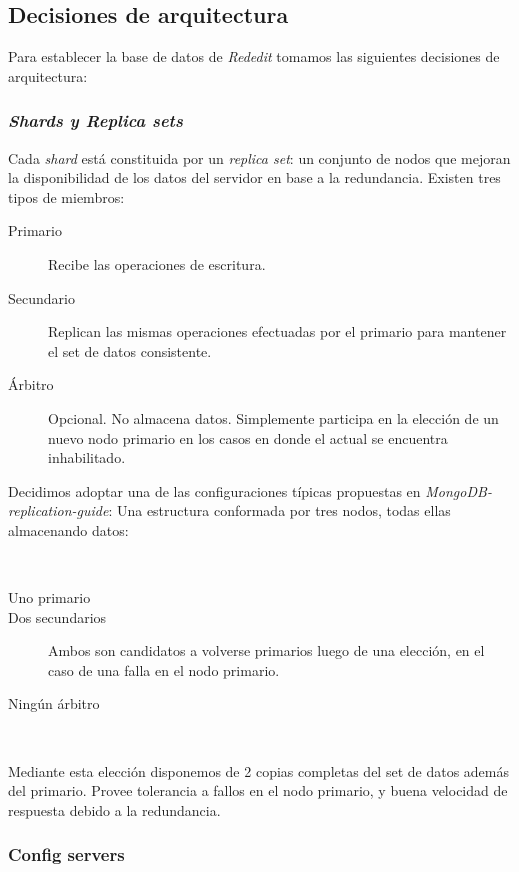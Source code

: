 \subsection{Decisiones de arquitectura}

Para establecer la base de datos de \emph{Rededit} tomamos las siguientes decisiones de arquitectura:

\subsubsection{\emph{Shards y Replica sets}}

Cada \emph{shard} está constituida por un \emph{replica set}: un conjunto de nodos que mejoran la 
disponibilidad de los datos del
servidor en base a la redundancia. Existen tres tipos de miembros:

\begin{description}
	\item[Primario] Recibe las operaciones de escritura.
	\item[Secundario] Replican las mismas operaciones efectuadas por el primario para mantener el set de datos consistente.
	\item[Árbitro] Opcional. 
	No almacena datos. Simplemente participa en la elección de un nuevo nodo primario en los casos en donde el actual se
	encuentra inhabilitado.
\end{description}

Decidimos adoptar una de las configuraciones típicas propuestas en \emph{MongoDB-replication-guide}: 
Una estructura conformada por tres nodos, todas ellas almacenando datos: 

~

\begin{description}
	\item[Uno primario] 
	\item[Dos secundarios] Ambos son candidatos a volverse primarios luego de una elección, en el caso de una falla
	en el nodo primario.
	\item[Ningún árbitro]
\end{description}

~

Mediante esta elección disponemos de 2 copias completas del set de datos además del primario. Provee tolerancia a fallos
en el nodo primario, y buena velocidad de respuesta debido a la redundancia.

\subsubsection{Config servers}

